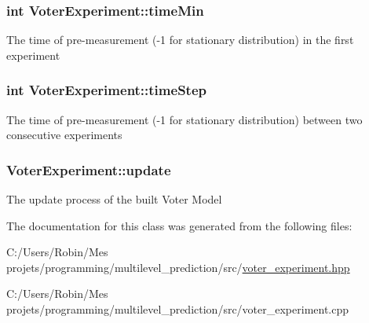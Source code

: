 \subsubsection[{time\+Min}]{\setlength{\rightskip}{0pt plus 5cm}int Voter\+Experiment\+::time\+Min}\label{class_voter_experiment_aa27e26baf58fb885bf20bc437bbc8b04}
The time of pre-\/measurement (-\/1 for stationary distribution) in the first experiment \hypertarget{class_voter_experiment_ad84ef40e21aeb5406a954d6ff38d7dc4}{}
\subsubsection[{time\+Step}]{\setlength{\rightskip}{0pt plus 5cm}int Voter\+Experiment\+::time\+Step}\label{class_voter_experiment_ad84ef40e21aeb5406a954d6ff38d7dc4}
The time of pre-\/measurement (-\/1 for stationary distribution) between two consecutive experiments \hypertarget{class_voter_experiment_af6c2b58598cbf149ba835dc1da4c327a}{}
\subsubsection[{update}]{ Voter\+Experiment\+::update}\label{class_voter_experiment_af6c2b58598cbf149ba835dc1da4c327a}
The update process of the built Voter Model 

The documentation for this class was generated from the following files\+:\begin{DoxyCompactItemize}
\item 
C\+:/\+Users/\+Robin/\+Mes projets/programming/multilevel\+\_\+prediction/src/\hyperlink{voter__experiment_8hpp}{voter\+\_\+experiment.\+hpp}\item 
C\+:/\+Users/\+Robin/\+Mes projets/programming/multilevel\+\_\+prediction/src/voter\+\_\+experiment.\+cpp\end{DoxyCompactItemize}
